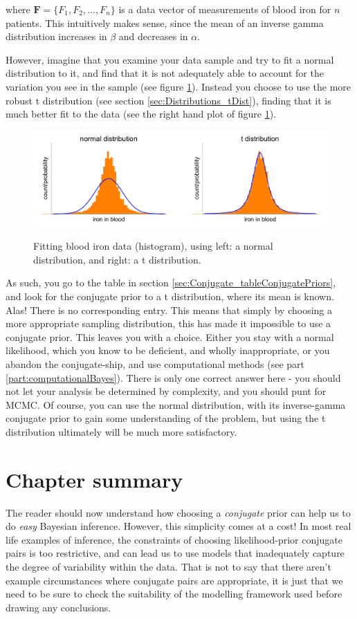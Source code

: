 \documentclass[11pt,fullpage]{book}
\begin{document}
where $\boldsymbol{F}=\{F_1,F_2,...,F_n\}$ is a data vector of measurements of blood iron for $n$ patients. This intuitively makes sense, since the mean of an inverse gamma distribution increases in $\beta$ and decreases in $\alpha$. 

However, imagine that you examine your data sample and try to fit a normal distribution to it, and find that it is not adequately able to account for the variation you see in the sample (see figure \ref{fig:Conjugate_lessonsNormT}). Instead you choose to use the more robust t distribution (see section \ref{sec:Distributions_tDist}), finding that it is much better fit to the data (see the right hand plot of figure \ref{fig:Conjugate_lessonsNormT}). 

\begin{figure}
\centering
\scalebox{0.3} 
{\includegraphics{Conjugate_lessonsNormT.pdf}}
\caption{Fitting blood iron data (histogram), using left: a normal distribution, and right: a t distribution.}\label{fig:Conjugate_lessonsNormT}
\end{figure}

As such, you go to the table in section \ref{sec:Conjugate_tableConjugatePriors}, and look for the conjugate prior to a t distribution, where its mean is known. Alas! There is no corresponding entry. This means that simply by choosing a more appropriate sampling distribution, this has made it impossible to use a conjugate prior. This leaves you with a choice. Either you stay with a normal likelihood, which you know to be deficient, and wholly inappropriate, or you abandon the conjugate-ship, and use computational methods (see part \ref{part:computationalBayes}). There is only one correct answer here - you should not let your analysis be determined by complexity, and you should punt for MCMC. Of course, you can use the normal distribution, with its inverse-gamma conjugate prior to gain some understanding of the problem, but using the t distribution ultimately will be much more satisfactory. 

\section{Chapter summary}
The reader should now understand how choosing a \textit{conjugate} prior can help us to do \textit{easy} Bayesian inference. However, this simplicity comes at a cost! In most real life examples of inference, the constraints of choosing likelihood-prior conjugate pairs is too restrictive, and can lead us to use models that inadequately capture the degree of variability within the data. That is not to say that there aren't example circumstances where conjugate pairs are appropriate, it is just that we need to be sure to check the suitability of the modelling framework used before drawing any conclusions.
\end{document}

